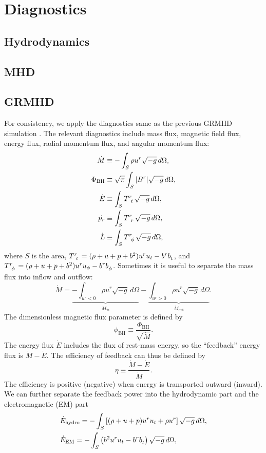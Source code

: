 \documentclass{article}
\begin{document}
\section{Diagnostics}

\subsection{Hydrodynamics}

\subsection{MHD}

\subsection{GRMHD}
For consistency, we apply the diagnostics same as the previous GRMHD simulation \cite{Guo:2025sjb}. The relevant diagnostics include mass flux, magnetic field flux, energy flux, radial momentum flux, and angular momentum flux:
\begin{align}
    \dot{M}&\equiv-\int_S \rho u^r\sqrt{-g}\,d \Omega,\\
    \Phi_\mathrm{BH}&\equiv \sqrt{\pi} \int_S |B^r|\sqrt{-g}\,d\Omega,\\
    \dot{E}&\equiv \int_S \tensor{T}{^r_t}\sqrt{-g}\,d\Omega,\\
    \dot{p_r}&\equiv \int_S \tensor{T}{^r_r}\sqrt{-g}\,d\Omega,\\
    \dot{L}&\equiv \int_S \tensor{T}{^r_\phi}\sqrt{-g}\,d\Omega,
\end{align}
where $S$ is the area, $\tensor{T}{^r_t}=(\rho+u+p+b^2)u^{r}u_{t}-\tensor{b}{^r}\tensor{b}{_t}$, and $\tensor{T}{^r_\phi}=(\rho+u+p+b^2)u^{r}u_{\phi}-\tensor{b}{^r}\tensor{b}{_\phi}$.
Sometimes it is useful to separate the mass flux into inflow and outflow:
\begin{equation}
    \dot{M}=\underbrace{-\int_{u^r<0}\rho u^r\sqrt{-g}\,d \Omega}_{\dot{M}_\mathrm{in}}-\underbrace{\int_{u^r>0}\rho u^r\sqrt{-g}\,d \Omega}_{\dot{M}_\mathrm{out}}.
\end{equation}
The dimensionless magnetic flux parameter is defined by
\begin{equation}
    \phi_\mathrm{BH}\equiv\frac{\Phi_\mathrm{BH}}{\sqrt{\dot{M}}}.
\end{equation}
The energy flux $\dot{E}$ includes the flux of rest-mass energy, so the ``feedback'' energy flux is $\dot{M}-\dot{E}$. The efficiency of feedback can thus be defined by
\begin{equation}
    \eta\equiv \frac{\dot{M}-\dot{E}}{\dot{M}}.
\end{equation}
The efficiency is positive (negative) when energy is transported outward (inward). We can further separate the feedback power into the hydrodynamic part and the electromagnetic (EM) part
\begin{align}
    &\dot{E}_\mathrm{hydro}=-\int_S \left[(\rho+u+p)u^{r}u_{t}+\rho u^r\right]\sqrt{-g}\,d\Omega, \\
    &\dot{E}_\mathrm{EM}=-\int_S \left(b^2u^{r}u_{t}-\tensor{b}{^r}\tensor{b}{_t}\right)\sqrt{-g}\,d\Omega,
\end{align}
\end{document}
